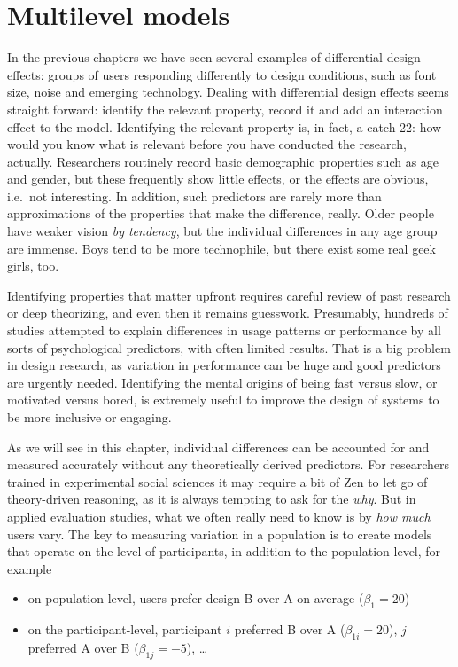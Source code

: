 \documentclass[]{svmono}
\providecommand{\tightlist}{%
  \setlength{\itemsep}{0pt}\setlength{\parskip}{0pt}}
\theoremstyle{definition}
\theoremstyle{definition}
\theoremstyle{definition}
\theoremstyle{remark}
\begin{document}
\chapter{Multilevel models}\label{multilevel-models}

In the previous chapters we have seen several examples of differential
design effects: groups of users responding differently to design
conditions, such as font size, noise and emerging technology. Dealing
with differential design effects seems straight forward: identify the
relevant property, record it and add an interaction effect to the model.
Identifying the relevant property is, in fact, a catch-22: how would you
know what is relevant before you have conducted the research, actually.
Researchers routinely record basic demographic properties such as age
and gender, but these frequently show little effects, or the effects are
obvious, i.e.~not interesting. In addition, such predictors are rarely
more than approximations of the properties that make the difference,
really. Older people have weaker vision \emph{by tendency}, but the
individual differences in any age group are immense. Boys tend to be
more technophile, but there exist some real geek girls, too.

Identifying properties that matter upfront requires careful review of
past research or deep theorizing, and even then it remains guesswork.
Presumably, hundreds of studies attempted to explain differences in
usage patterns or performance by all sorts of psychological predictors,
with often limited results. That is a big problem in design research, as
variation in performance can be huge and good predictors are urgently
needed. Identifying the mental origins of being fast versus slow, or
motivated versus bored, is extremely useful to improve the design of
systems to be more inclusive or engaging.

As we will see in this chapter, individual differences can be accounted
for and measured accurately without any theoretically derived
predictors. For researchers trained in experimental social sciences it
may require a bit of Zen to let go of theory-driven reasoning, as it is
always tempting to ask for the \emph{why}. But in applied evaluation
studies, what we often really need to know is by \emph{how much} users
vary. The key to measuring variation in a population is to create models
that operate on the level of participants, in addition to the population
level, for example

\begin{itemize}
\tightlist
\item
  on population level, users prefer design B over A on average
  (\(\beta_1 = 20\))
\item
  on the participant-level, participant \(i\) preferred B over A
  (\(\beta_{1i} = 20\)), \(j\) preferred A over B (\(\beta_{1j} = -5\)),
  \ldots{}
\end{itemize}
\end{document}
